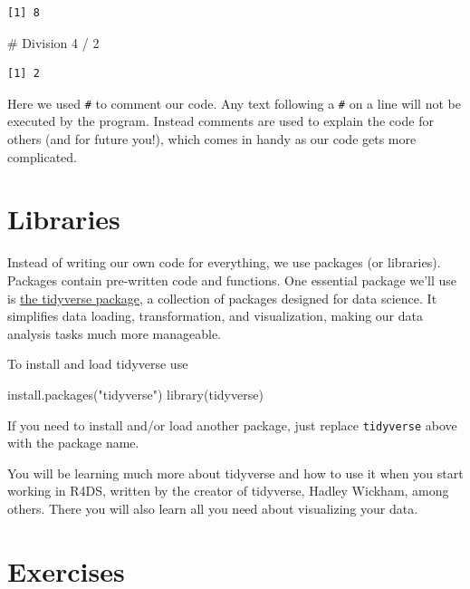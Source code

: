 \documentclass[
  letterpaper,
  DIV=11,
  numbers=noendperiod]{scrreprt}
\newenvironment{Shaded}{\begin{snugshade}}{\end{snugshade}}
\newcommand{\CommentTok}[1]{\textcolor[rgb]{0.37,0.37,0.37}{#1}}
\newcommand{\DecValTok}[1]{\textcolor[rgb]{0.68,0.00,0.00}{#1}}
\newcommand{\FunctionTok}[1]{\textcolor[rgb]{0.28,0.35,0.67}{#1}}
\newcommand{\NormalTok}[1]{\textcolor[rgb]{0.00,0.23,0.31}{#1}}
\newcommand{\SpecialCharTok}[1]{\textcolor[rgb]{0.37,0.37,0.37}{#1}}
\newcommand{\StringTok}[1]{\textcolor[rgb]{0.13,0.47,0.30}{#1}}
\begin{document}
\begin{verbatim}
[1] 8
\end{verbatim}

\begin{Shaded}
\begin{Highlighting}[]
\CommentTok{\# Division}
\DecValTok{4} \SpecialCharTok{/} \DecValTok{2}
\end{Highlighting}
\end{Shaded}

\begin{verbatim}
[1] 2
\end{verbatim}

Here we used \texttt{\#} to comment our code. Any text following a
\texttt{\#} on a line will not be executed by the program. Instead
comments are used to explain the code for others (and for future you!),
which comes in handy as our code gets more complicated.

\section{Libraries}\label{libraries}

Instead of writing our own code for everything, we use packages (or
libraries). Packages contain pre-written code and functions. One
essential package we'll use is \href{https://www.tidyverse.org/}{the
tidyverse package}, a collection of packages designed for data science.
It simplifies data loading, transformation, and visualization, making
our data analysis tasks much more manageable.

To install and load tidyverse use

\begin{Shaded}
\begin{Highlighting}[]
\FunctionTok{install.packages}\NormalTok{(}\StringTok{"tidyverse"}\NormalTok{)}
\FunctionTok{library}\NormalTok{(tidyverse)}
\end{Highlighting}
\end{Shaded}

If you need to install and/or load another package, just replace
\texttt{tidyverse} above with the package name.

You will be learning much more about tidyverse and how to use it when
you start working in R4DS, written by the creator of tidyverse, Hadley
Wickham, among others. There you will also learn all you need about
visualizing your data.

\section{Exercises}\label{exercises}
\end{document}
